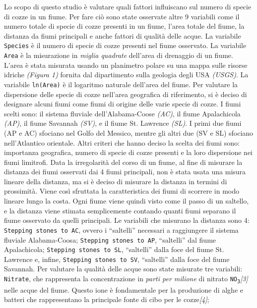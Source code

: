 \documentclass{article} %
\begin{document}
Lo scopo di questo studio è valutare quali fattori influiscano sul numero di specie di cozze in un fiume. Per fare ciò sono state osservate altre 9 variabili come il numero totale di specie di cozze presenti in un fiume, l'area totale del fiume, la distanza da fiumi principali e anche fattori di qualità delle acque. 
La variabile \texttt{Species} è il numero di specie di cozze presenti nel fiume osservato. 
La variabile \texttt{Area} è la misurazione in \textit{miglia quadrate} dell'area di drenaggio di un fiume. L'area è stata misurata usando un planimetro polare su una mappa sulle risorse idriche \textit{(Figura 1)} fornita dal dipartimento sulla geologia degli USA \textit{(USGS)}.  
La variabile \texttt{ln(Area)} è il logaritmo naturale dell'area del fiume.
Per valutare la dispersione delle specie di cozze nell'area geografica di riferimento, si è deciso di designare alcuni fiumi come fiumi di origine delle varie specie di cozze. 
I fiumi scelti sono: il sistema fluviale dell'Alabama-Coose \textit{(AC)}, il fiume Apalachicola \textit{(AP)}, il fiume Savannah \textit{(SV)}, e il fiume St. Lawrence \textit{(SL)}. I primi due fiumi (AP e AC) sfociano nel Golfo del Messico, mentre gli altri due (SV e SL) sfociano nell'Atlantico orientale. Altri criteri che hanno deciso la scelta dei fiumi sono: importanza geografica, numero di specie di cozze presenti e la loro dispersione nei fiumi limitrofi. Data la irregolarità del corso di un fiume, al fine di misurare la distanza dei fiumi osservati dai 4 fiumi principali, non è stata usata una misura lineare della distanza, ma si è deciso di misurare la distanza in termini di prossimità. Viene così sfruttata la caratteristica dei fiumi di scorrere in modo lineare lungo la costa. Ogni fiume viene quindi visto come il passo di un saltello, e la distanza viene stimata semplicemente contando quanti fiumi separano il fiume osservato da quelli principali. Le variabili che misurano la distanza sono 4: 
\texttt{Stepping stones to AC}, ovvero i “saltelli” necessari a raggiungere il sistema fluviale Alabama-Coosa; 
\texttt{Stepping stones to AP}, “saltelli” dal fiume Apalachicola; 
\texttt{Stepping stones to SL}, “saltelli” dalla foce del fiume St. Lawrence e, infine, 
\texttt{Stepping stones to SV}, “saltelli” dalla foce del fiume Savannah.
Per valutare la qualità delle acque sono state misurate tre variabili: 
\texttt{Nitrate}, che rappresenta la concentrazione in \textit{parti per milione} di nitrato \texttt{NO\textsubscript{3}}\textit{[3]} nelle acque del fiume. Questo ione è fondamentale per la produzione di alghe e batteri che rappresentano la principale fonte di cibo per le cozze\textit{[4]}; 
\end{document}

